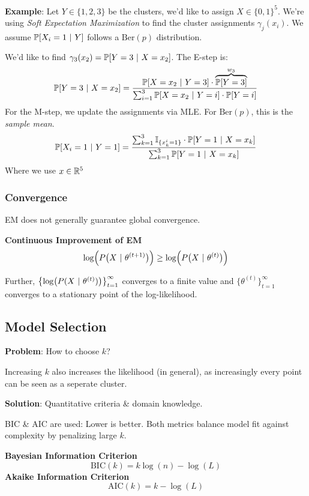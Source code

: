 {\footnotesize
    \textbf{Example}: Let $Y \in \{1,2,3\}$ be the clusters, we'd like to assign $X \in \{0,1\}^5$. We're using \textit{Soft Expectation Maximization} to find the cluster assignments $\gamma_j(x_i)$. We assume $\mathbb{P}[X_i = 1 \ |\  Y]$ follows a $\text{Ber}(p)$ distribution.
    
    We'd like to find $\gamma_3(x_2) = \mathbb{P}[Y=3 \ |\  X=x_2]$. The E-step is:
    $$
    \mathbb{P}[Y=3 \ |\  X=x_2] = \frac{\mathbb{P}[X=x_2\ |\  Y=3]\cdot \overbrace{\mathbb{P}[Y=3]}^{w_3}}{\sum_{i=1}^{3}\mathbb{P}[X=x_2\ |\  Y=i]\cdot\mathbb{P}[Y=i]}
    $$
    For the M-step, we update the assignments via MLE. For $\text{Ber}(p)$, this is the \textit{sample mean}.
    $$
    \mathbb{P}[X_i=1 \ |\  Y=1] = \frac{\sum_{k=1}^{3}\mathbb{I}_{\{x_k^i=1\}}\cdot\mathbb{P}[Y=1\ |\  X=x_k]}{\sum_{k=1}^3\mathbb{P}[Y=1\ |\  X=x_k]}
    $$
    Where we use $x\in \mathbb{R}^5$
}

\subsubsection{Convergence}

EM does not generally guarantee global convergence.

\theorem \textbf{Continuous Improvement of EM}\\
$$
    \log\Bigl( P\bigl( X \ |\  \theta^{(t+1)} \bigr) \Bigr) \geq \log\Bigl( P\bigl( X \ |\  \theta^{(t)} \bigr) \Bigr)
$$

Further, $\bigl\{ \log\bigl(P(X\ |\ \theta^{(t)})\bigr) \bigr\}_{t=1}^\infty$ converges to a finite value and $\bigl\{ \theta^{(t)} \bigr\}_{t=1}^\infty$ converges to a stationary point of the log-likelihood.

\subsection{Model Selection}

\textbf{Problem}: How to choose $k$?

{\footnotesize
    \remark Increasing $k$ also increases the likelihood (in general), as increasingly every point can be seen as a seperate cluster.
}

\textbf{Solution}: Quantitative criteria \& domain knowledge.

BIC \& AIC are used: Lower is better. Both metrics balance model fit against complexity by penalizing large $k$.

 \textbf{Bayesian Information Criterion} 
$$
    \text{BIC}(k) = k\log(n)-\log(L)
$$
 \textbf{Akaike Information Criterion}
$$
    \text{AIC}(k) = k - \log(L)
$$

